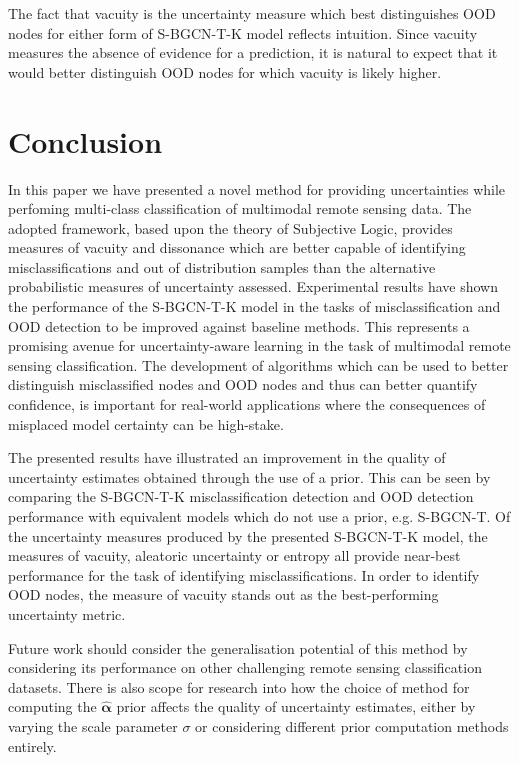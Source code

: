 \documentclass[
twocolumn,
]{ceurart}
\begin{document}
The fact that vacuity is the uncertainty measure which best distinguishes OOD nodes for either form of S-BGCN-T-K model reflects intuition.
Since vacuity measures the absence of evidence for a prediction, it is natural to expect that it would better distinguish OOD nodes for which vacuity is likely higher.

\section{Conclusion}
\label{sec::conclusion}

In this paper we have presented a novel method for providing uncertainties while perfoming multi-class classification of multimodal remote sensing data.
The adopted framework, based upon the theory of Subjective Logic, provides measures of vacuity and dissonance which are better capable of identifying misclassifications and out of distribution samples than the alternative probabilistic measures of uncertainty assessed.
Experimental results have shown the performance of the S-BGCN-T-K model in the tasks of misclassification and OOD detection to be improved against baseline methods.
This represents a promising avenue for uncertainty-aware learning in the task of multimodal remote sensing classification.
The development of algorithms which can be used to better distinguish misclassified nodes and OOD nodes and thus can better quantify confidence, is important for real-world applications where the consequences of misplaced model certainty can be high-stake.

The presented results have illustrated an improvement in the quality of uncertainty estimates obtained through the use of a prior.
This can be seen by comparing the S-BGCN-T-K misclassification detection and OOD detection performance with equivalent models which do not use a prior, e.g. S-BGCN-T.
Of the uncertainty measures produced by the presented S-BGCN-T-K model, the measures of vacuity, aleatoric uncertainty or entropy all provide near-best performance for the task of identifying misclassifications.
In order to identify OOD nodes, the measure of vacuity stands out as the best-performing   uncertainty metric.

Future work should consider the generalisation potential of this method by considering its performance on other challenging remote sensing classification datasets. There is also scope for research into how the choice of method for computing the $\hat{\boldsymbol{\alpha}}$ prior affects the quality of uncertainty estimates, either by varying the scale parameter $\sigma$ or considering different prior computation methods entirely.


\end{document}
